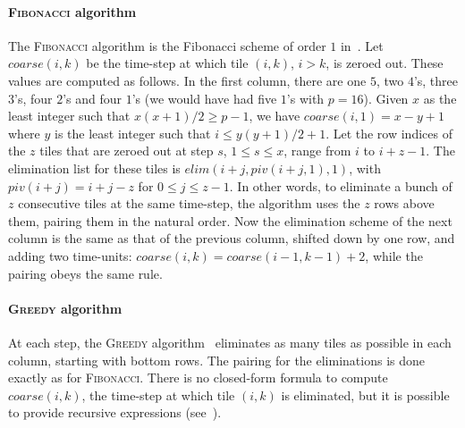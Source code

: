 \documentclass[a4paper,twopages]{article}
\newcommand{\elim}{\mathit{elim}}
\newcommand{\coarse}{\ensuremath{\mathit{coarse}}\xspace}
\newcommand{\MC}{\textsc{Fibonacci}\xspace}
\newcommand{\Greedy}{\textsc{Greedy}\xspace}
\begin{document}
\paragraph{\MC algorithm}
The \MC algorithm is the Fibonacci scheme of order $1$ in~\cite{ModiClarke84}.
Let $\coarse(i,k)$ be the time-step at which tile $(i,k)$, $i>k$, is zeroed
out.  These values are computed as follows. In the first column, there are one
$5$, two $4$'s, three $3$'s, four $2$'s and four $1$'s (we would have had five
$1$'s with $p=16$).  Given $x$ as the least integer such that $x(x+1)/2 \geq
p-1$, we have $\coarse(i,1)= x-y+1$ where $y$ is the least integer such that $
i \leq y(y+1)/2 +1$.  Let the row indices of the $z$ tiles that are zeroed out at
step $s$, $1 \leq s \leq x$, range from $i$ to $i+z-1$. The elimination list
for these tiles is $\elim(i+j, piv(i+j,1), 1)$, with $piv(i+j) = i+j-z$ for $0
\leq j \leq z-1$. In other words, to eliminate a bunch of $z$ consecutive tiles
at the same time-step, the algorithm uses the $z$ rows above them, pairing them
in the natural order.  Now the elimination scheme of the next column is the
same as that of the previous column, shifted down by one row, and adding two
time-units: $\coarse(i,k) = \coarse(i-1,k-1)+2$, while the pairing obeys the
same rule.


\paragraph{\Greedy algorithm}
At each step, the \Greedy algorithm~\cite{j14,j12} eliminates as many tiles as
possible in each column, starting with bottom rows. The pairing for the
eliminations is done exactly as for \MC.  There is no closed-form formula to
compute $\coarse(i,k)$, the time-step at which tile $(i,k)$ is eliminated, but
it is possible to provide recursive expressions (see~\cite{j14,j12}).
\end{document}

